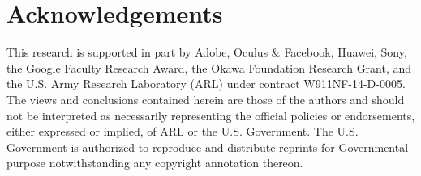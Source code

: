 \section{Acknowledgements}

This research is supported in part by Adobe, Oculus \& Facebook, Huawei, Sony, the Google Faculty Research Award, the Okawa Foundation Research Grant, and the U.S. Army Research Laboratory (ARL) under contract W911NF-14-D-0005. The views and conclusions contained herein are those of the authors and should not be interpreted as necessarily representing the official policies or endorsements, either expressed or implied, of ARL or the U.S. Government. The U.S. Government is authorized to reproduce and distribute reprints for Governmental purpose notwithstanding any copyright annotation thereon. 


